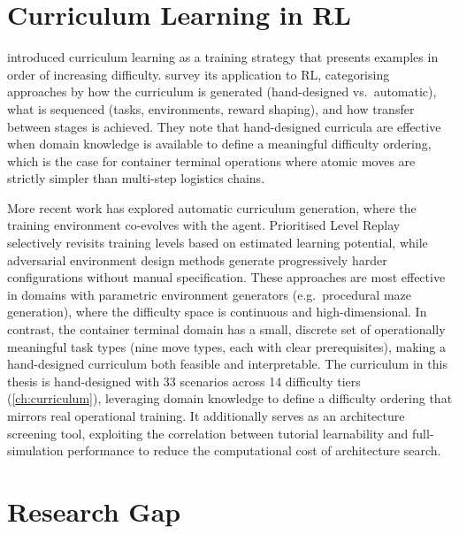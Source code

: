 \section{Curriculum Learning in RL}
\label{sec:rw:curriculum}

\textcite{bengio2009curriculum} introduced curriculum learning as a training strategy that presents examples in order of increasing difficulty. \textcite{narvekar2020curriculum} survey its application to RL, categorising approaches by how the curriculum is generated (hand-designed vs.\ automatic), what is sequenced (tasks, environments, reward shaping), and how transfer between stages is achieved. They note that hand-designed curricula are effective when domain knowledge is available to define a meaningful difficulty ordering, which is the case for container terminal operations where atomic moves are strictly simpler than multi-step logistics chains.

More recent work has explored automatic curriculum generation, where the training environment co-evolves with the agent. Prioritised Level Replay \cite{jiang2021plr} selectively revisits training levels based on estimated learning potential, while adversarial environment design methods generate progressively harder configurations without manual specification. These approaches are most effective in domains with parametric environment generators (e.g.\ procedural maze generation), where the difficulty space is continuous and high-dimensional. In contrast, the container terminal domain has a small, discrete set of operationally meaningful task types (nine move types, each with clear prerequisites), making a hand-designed curriculum both feasible and interpretable. The curriculum in this thesis is hand-designed with 33 scenarios across 14 difficulty tiers (\cref{ch:curriculum}), leveraging domain knowledge to define a difficulty ordering that mirrors real operational training. It additionally serves as an architecture screening tool, exploiting the correlation between tutorial learnability and full-simulation performance to reduce the computational cost of architecture search.

\section{Research Gap}
\label{sec:rw:gap}


